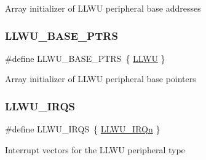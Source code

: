 Array initializer of L\+L\+WU peripheral base addresses \mbox{\label{group___l_l_w_u___peripheral___access___layer_ga4826d688973513cc02a2f1d4f67c336b}} 
\subsubsection{\texorpdfstring{LLWU\_BASE\_PTRS}{LLWU\_BASE\_PTRS}}
{\footnotesize\ttfamily \#define L\+L\+W\+U\+\_\+\+B\+A\+S\+E\+\_\+\+P\+T\+RS~\{ \mbox{\hyperlink{group___l_l_w_u___peripheral___access___layer_gaed2d6ced03dff7739533096e53983dbe}{L\+L\+WU}} \}}

Array initializer of L\+L\+WU peripheral base pointers \mbox{\label{group___l_l_w_u___peripheral___access___layer_ga00f85a14dffe324ff8e867f8b06f1461}} 
\subsubsection{\texorpdfstring{LLWU\_IRQS}{LLWU\_IRQS}}
{\footnotesize\ttfamily \#define L\+L\+W\+U\+\_\+\+I\+R\+QS~\{ \mbox{\hyperlink{group___interrupt__vector__numbers_gga666eb0caeb12ec0e281415592ae89083a8b7bac6898a42e6dadf89d7c8b07baaa}{L\+L\+W\+U\+\_\+\+I\+R\+Qn}} \}}

Interrupt vectors for the L\+L\+WU peripheral type 